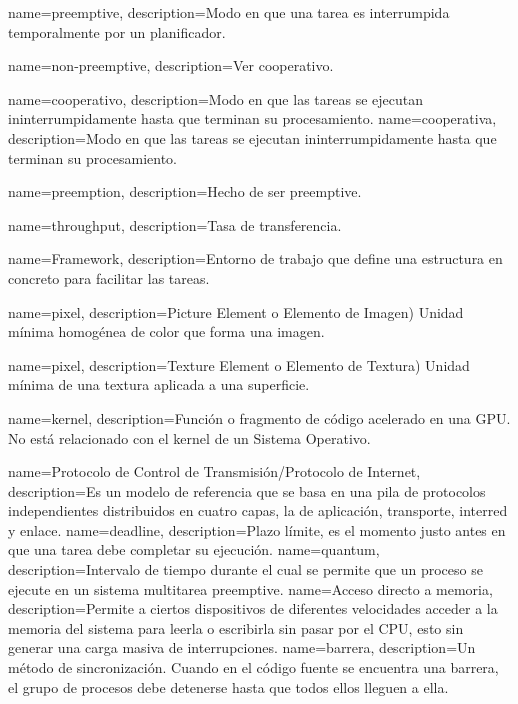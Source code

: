 
{
  name={preemptive},
  description={Modo en que una tarea es interrumpida temporalmente por un planificador.}
}

{
  name={non-preemptive},
  description={Ver cooperativo.}
}

{
  name={cooperativo},
  description={Modo en que las tareas se ejecutan ininterrumpidamente hasta que terminan su procesamiento.}
}
{
  name={cooperativa},
  description={Modo en que las tareas se ejecutan ininterrumpidamente hasta que terminan su procesamiento.}
}

{
  name={preemption},
  description={Hecho de ser preemptive.}
}


{
  name={throughput},
  description={Tasa de transferencia.}
}

{
  name={Framework},
  description={Entorno de trabajo que define una estructura en concreto para facilitar las tareas.}
}

{
  name={pixel},
  description={Picture Element o Elemento de Imagen) Unidad mínima homogénea de color que forma una imagen.}
}

{
  name={pixel},
  description={Texture Element o Elemento de Textura)  Unidad mínima de una textura aplicada a una superficie.}
}

{
  name={kernel},
  description={Función o fragmento de código acelerado en una GPU. No está relacionado con el kernel de un Sistema Operativo.}
}

{
  name={Protocolo de Control de Transmisión/Protocolo de Internet},
  description={Es un modelo de referencia que se basa en una pila de protocolos independientes distribuidos en cuatro capas, la de aplicación, transporte, interred y enlace. \cite{tanenbaum_wetherall_2012}}
}
{
  name={deadline},
  description={Plazo límite, es el momento justo antes en que una tarea debe completar su ejecución.}
}
{
  name={quantum},
  description={Intervalo de tiempo durante el cual se permite que un proceso se ejecute en un sistema multitarea preemptive.}
}
{
  name={Acceso directo a memoria},
  description={Permite a ciertos dispositivos de diferentes velocidades acceder a la memoria del sistema para leerla o escribirla sin pasar por el CPU, esto sin generar una carga masiva de interrupciones.}
}
{
  name={barrera},
  description={Un método de sincronización. Cuando en el código fuente se encuentra una barrera, el grupo de procesos debe detenerse hasta que todos ellos lleguen a ella.}
}

